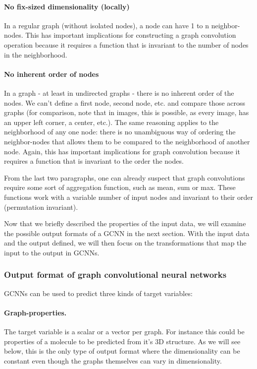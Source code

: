\paragraph{No fix-sized dimensionality (locally)}
In a regular graph (without isolated nodes), a node can have 1 to n neighbor-nodes. This has important implications for constructing a graph convolution operation because it requires a function that is invariant to the number of nodes in the neighborhood. 
\paragraph{No inherent order of nodes}
In a graph - at least in undirected graphs - there is no inherent order of the nodes. We can't define a first node, second node, etc. and compare those across graphs (for comparison, note that in images, this is possible, as every image, has an upper left corner, a center, etc.). The same reasoning applies to the neighborhood of any one node: there is no unambiguous way of ordering the neighbor-nodes that allows them to be compared to the neighborhood of another node. Again, this has important implications for graph convolution because it requires a function that is invariant to the order the nodes.

From the last two paragraphs, one can already suspect that graph convolutions require some sort of aggregation function, such as mean, sum or max. These functions work with a variable number of input nodes and invariant to their order (permutation invariant).

Now that we briefly described the properties of the input data, we will examine the possible output formats of a GCNN in the next section. With the input data and the output defined, we will then focus on the transformations that map the input to the output in GCNNs.

\subsubsection{Output format of graph convolutional neural networks}

GCNNs can be used to predict three kinds of target variables:

\paragraph{Graph-properties.}
The target variable is a scalar or a vector per graph. For instance this could be properties of a molecule to be predicted from it's 3D structure. As we will see below, this is the only type of output format where the dimensionality can be constant even though the graphs themselves can vary in dimensionality.
